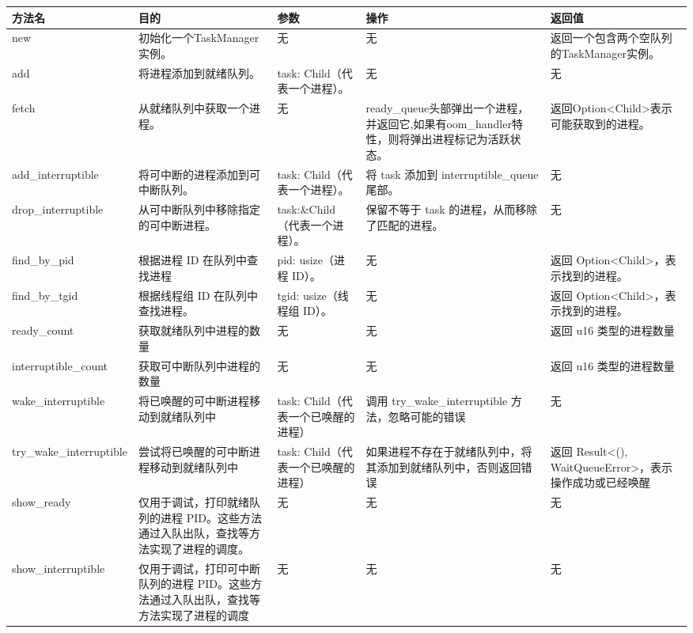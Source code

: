 \begin{table}[H]
    \centering
    \begin{tabularx}{17cm}{|X|X|X|X|X|}
        \hline
        方法名 & 目的 & 参数 & 操作 & 返回值 \\
        \hline
        new & 初始化一个TaskManager实例。& 无 & 无 & 返回一个包含两个空队列的TaskManager实例。 \\
        \hline
        add & 将进程添加到就绪队列。 & task: Child（代表一个进程）。 & 无 & 无 \\
        \hline
        fetch & 从就绪队列中获取一个进程。 & 无 & ready_queue头部弹出一个进程，并返回它,如果有oom_handler特性，则将弹出进程标记为活跃状态。 & 返回Option<Child>表示可能获取到的进程。 \\
        \hline
        add_interruptible & 将可中断的进程添加到可中断队列。 & task: Child（代表一个进程）。 & 将 task 添加到 interruptible_queue 尾部。 & 无 \\
        \hline
        drop_interruptible & 从可中断队列中移除指定的可中断进程。 & task:\&Child（代表一个进程）。 & 保留不等于 task 的进程，从而移除了匹配的进程。 & 无 \\
        \hline
        find_by_pid & 根据进程 ID 在队列中查找进程 & pid: usize（进程 ID）。 & 无 & 返回 Option<Child>，表示找到的进程。 \\
        \hline
        find_by_tgid & 根据线程组 ID 在队列中查找进程。 & tgid: usize（线程组 ID）。 & 无 & 返回 Option<Child>，表示找到的进程。 \\
        \hline
        ready_count & 获取就绪队列中进程的数量 & 无 & 无 & 返回 u16 类型的进程数量 \\
        \hline
        interruptible_count	& 获取可中断队列中进程的数量 & 无 & 无 & 返回 u16 类型的进程数量 \\
        \hline
        wake_interruptible & 将已唤醒的可中断进程移动到就绪队列中 & task: Child（代表一个已唤醒的进程） & 调用 try_wake_interruptible 方法，忽略可能的错误 & 无 \\
        \hline
        try_wake_interruptible & 尝试将已唤醒的可中断进程移动到就绪队列中 & task: Child（代表一个已唤醒的进程） & 如果进程不存在于就绪队列中，将其添加到就绪队列中，否则返回错误 & 返回 Result<(), WaitQueueError>，表示操作成功或已经唤醒 \\
        \hline
        show_ready & 仅用于调试，打印就绪队列的进程 PID。这些方法通过入队出队，查找等方法实现了进程的调度。 & 无 & 无 & 无 \\
        \hline
        show_interruptible & 仅用于调试，打印可中断队列的进程 PID。这些方法通过入队出队，查找等方法实现了进程的调度 & 无 & 无 & 无 \\
        \hline
    \end{tabularx}
\end{table}
